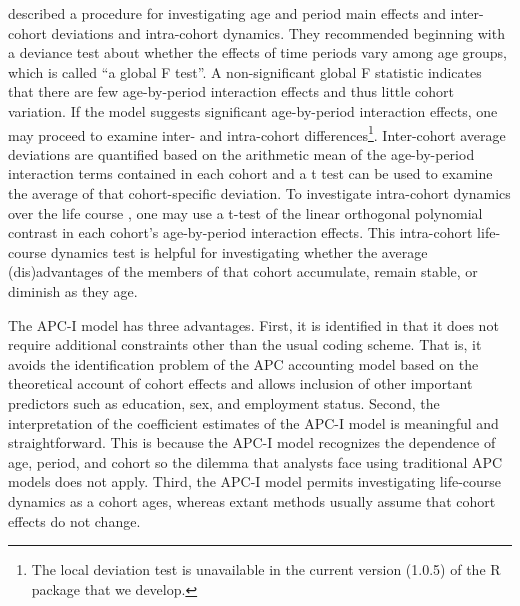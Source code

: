 \citet{luo_age-period-cohort-interaction_2020} described a procedure for investigating age and period main effects and inter-cohort deviations and intra-cohort dynamics.  They recommended beginning with a deviance test about whether the effects of time periods vary among age groups, which is called ``a global F test''. A non-significant global F statistic indicates that there are few age-by-period interaction effects and thus little cohort variation.  If the model suggests significant age-by-period interaction effects, one may proceed to examine inter- and intra-cohort differences\footnote{The local deviation test is unavailable in the current version (1.0.5) of the R package that we develop.}.  Inter-cohort average deviations are quantified based on the arithmetic mean of the age-by-period interaction terms contained in each cohort and a t test can be used to examine the average of that cohort-specific deviation.  To investigate intra-cohort dynamics over the life course \citep[e.g., the cumulative (dis)advantage hypothesis in][]{dannefer_aging_1987, ferraro_what_2018,chauvelTestingPersistenceCohort2016,obrienEstimableIntraageIntraperiod2020}, one may use a t-test of the linear orthogonal polynomial contrast in each cohort's age-by-period interaction effects.  This intra-cohort life-course dynamics test is helpful for investigating whether the average (dis)advantages of the members of that cohort accumulate, remain stable, or diminish as they age.

The APC-I model has three advantages.  First, it is identified in that it does not require additional constraints other than the usual coding scheme. That is, it avoids the identification problem of the APC accounting model based on the theoretical account of cohort effects and allows inclusion of other important predictors such as education, sex, and employment status.  Second, the interpretation of the coefficient estimates of the APC-I model is meaningful and straightforward.  This is because the APC-I model recognizes the dependence of age, period, and cohort so the dilemma that analysts face using traditional APC models does not apply. Third, the APC-I model permits investigating life-course dynamics as a cohort ages, whereas extant methods usually assume that cohort effects do not change.

